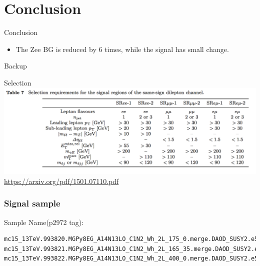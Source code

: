\documentclass[mathserif,serif]{beamer}
\begin{document}
\section{Conclusion}
\begin{frame}{Conclusion}
\begin{itemize}
\item The Zee BG is reduced by 6 times, while the signal has small change.
\end{itemize}
\end{frame}

\begin{frame}
\begin{center}
\huge
Backup
\end{center}
\end{frame}

\begin{frame}{Selection}
\includegraphics[width=\textwidth]{data/photo/SRcutrun1.png} \\
\url{https://arxiv.org/pdf/1501.07110.pdf}
\end{frame}

\begin{frame}[fragile]
\frametitle{Signal sample}
\small
Sample Name(p2972 tag):
\tiny
\begin{verbatim}
mc15_13TeV.993820.MGPy8EG_A14N13LO_C1N2_Wh_2L_175_0.merge.DAOD_SUSY2.e5678_a766_a821_r7676_p2949_p2972
mc15_13TeV.993821.MGPy8EG_A14N13LO_C1N2_Wh_2L_165_35.merge.DAOD_SUSY2.e5678_a766_a821_r7676_p2949_p2972
mc15_13TeV.993822.MGPy8EG_A14N13LO_C1N2_Wh_2L_400_0.merge.DAOD_SUSY2.e5678_a766_a821_r7676_p2949_p2972
\end{verbatim}
\end{frame}
\end{document}

